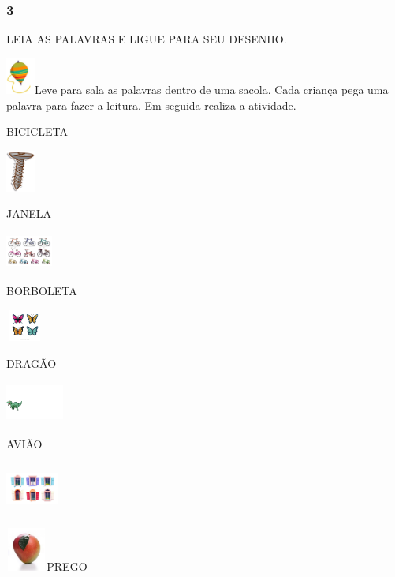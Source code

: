 \subsubsection{3 }\label{section-17}

LEIA AS PALAVRAS E LIGUE PARA SEU DESENHO.

\includegraphics[width=0.37431in,height=0.47083in]{media/image58.png}Leve
para sala as palavras dentro de uma sacola. Cada criança pega uma
palavra para fazer a leitura. Em seguida realiza a atividade.

BICICLETA

\includegraphics[width=0.38403in,height=0.53889in]{media/image59.png}

JANELA

\includegraphics[width=0.60069in,height=0.48056in]{media/image60.png}

BORBOLETA

\includegraphics[width=0.49028in,height=0.40833in]{media/image61.png}

DRAGÃO

\includegraphics[width=0.74931in,height=0.52292in]{media/image62.png}

AVIÃO

\includegraphics[width=0.68542in,height=0.66319in]{media/image63.png}

\includegraphics[width=0.53403in,height=0.56667in]{media/image64.jpeg}PREGO

